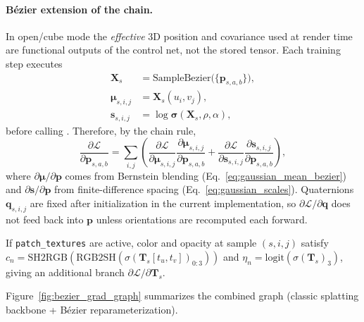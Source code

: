 \paragraph{B\'ezier extension of the chain.}
In open/cube mode the \emph{effective} 3D position and covariance used at render time are functional outputs of the control net, not the stored  tensor. Each training step executes
\begin{align}
\mathbf{X}_s &= \mathrm{SampleBezier}\bigl(\{\mathbf{p}_{s,a,b}\}\bigr), \\
\boldsymbol{\mu}_{s,i,j} &= \mathbf{X}_s(u_i,v_j), \\
\mathbf{s}_{s,i,j} &= \log\boldsymbol{\sigma}(\mathbf{X}_s,\rho,\alpha),
\label{eq:reparam_chain}
\end{align}
before calling . Therefore, by the chain rule,
\begin{equation}
\frac{\partial\mathcal{L}}{\partial \mathbf{p}_{s,a,b}}
=
\sum_{i,j}
\left(
\frac{\partial\mathcal{L}}{\partial\boldsymbol{\mu}_{s,i,j}}
\frac{\partial\boldsymbol{\mu}_{s,i,j}}{\partial \mathbf{p}_{s,a,b}}
+
\frac{\partial\mathcal{L}}{\partial\mathbf{s}_{s,i,j}}
\frac{\partial\mathbf{s}_{s,i,j}}{\partial \mathbf{p}_{s,a,b}}
\right),
\label{eq:grad_cp_chain}
\end{equation}
where $\partial\boldsymbol{\mu}/\partial\mathbf{p}$ comes from Bernstein blending (Eq.~\eqref{eq:gaussian_mean_bezier}) and $\partial\mathbf{s}/\partial\mathbf{p}$ from finite-difference spacing (Eq.~\eqref{eq:gaussian_scales}). Quaternions $\mathbf{q}_{s,i,j}$ are fixed after initialization in the current implementation, so $\partial\mathcal{L}/\partial\mathbf{q}$ does not feed back into $\mathbf{p}$ unless orientations are recomputed each forward.

If \texttt{patch\_textures} are active, color and opacity at sample $(s,i,j)$ satisfy
$c_n=\mathrm{SH2RGB}(\mathrm{RGB2SH}(\sigma(\mathbf{T}_s[t_u,t_v])_{0:3}))$ and $\eta_n=\mathrm{logit}(\sigma(\mathbf{T}_s)_{3})$, giving an additional branch $\partial\mathcal{L}/\partial\mathbf{T}_s$.

Figure~\ref{fig:bezier_grad_graph} summarizes the combined graph (classic splatting backbone + B\'ezier reparameterization).

